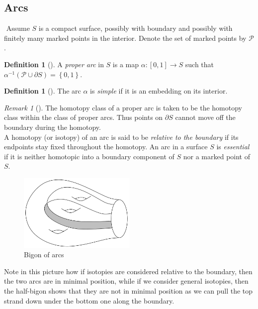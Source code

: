 \documentclass[reqno]{amsart}
\theoremstyle{definition}
\newtheorem{definition}[theorem]{Definition}
\theoremstyle{remark}
\newtheorem*{remark}{Remark}
\begin{document}



\subsection{Arcs}
$ $ \newline \newline
Assume $S$ is a compact surface, possibly with boundary
and possibly with finitely many marked points in the interior.
Denote the set of marked points by $\mathcal{P}$.

\begin{definition}[]
    A \textit{proper arc} in $S$ is a map $\alpha \colon
    \left[ 0,1 \right]  \to S$ such that
    $\alpha^{-1} \left( \mathcal{P} \cup \partial S \right) 
    = \left\{ 0,1 \right\} $.
\end{definition}
\begin{definition}[]
    The arc $\alpha$ is \textit{simple} if it is an embedding
on its interior.
\end{definition}

\begin{remark}[]
    The homotopy class of a proper arc is taken to be
    the homotopy class within the class of proper arcs.
    Thus points on $\partial S$ cannot move off the boundary
    during the homotopy.\\
    A homotopy (or isotopy) of an arc is said to
    be \textit{relative to the boundary} if its endpoints
    stay fixed throughout the homotopy. 
    An arc in a surface $S$ is \textit{essential} if it
    is neither homotopic into a boundary component of $S$ nor a
    marked point of $S$.
\end{remark}

\begin{figure}[htpb]
    \centering
    \includegraphics[width=0.5\textwidth]{bigon-of-arcs.png}
    \caption{Bigon of arcs}
    \label{fig:bigon-of-arcs-png}
\end{figure}
Note in this picture how if isotopies are considered relative
to the boundary, then the two arcs are in minimal position, while
if we consider general isotopies, then the half-bigon shows that
they are not in minimal position as we can pull the top strand down
under the bottom one along the boundary.
\end{document}
